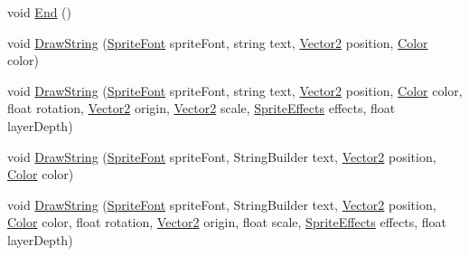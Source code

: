 \begin{DoxyCompactItemize}
\item 
void \hyperlink{class_microsoft_1_1_xna_1_1_framework_1_1_graphics_1_1_sprite_batch_aa31a6d628df3a751c361cfd70c50a5cb}{End} ()
\item 
void \hyperlink{class_microsoft_1_1_xna_1_1_framework_1_1_graphics_1_1_sprite_batch_a7b0afe482509ad47b5eccfb7a8fedb17}{Draw\+String} (\hyperlink{class_microsoft_1_1_xna_1_1_framework_1_1_graphics_1_1_sprite_font}{Sprite\+Font} sprite\+Font, string text, \hyperlink{struct_microsoft_1_1_xna_1_1_framework_1_1_vector2}{Vector2} position, \hyperlink{struct_microsoft_1_1_xna_1_1_framework_1_1_color}{Color} color)
\item 
void \hyperlink{class_microsoft_1_1_xna_1_1_framework_1_1_graphics_1_1_sprite_batch_a995753c36e285ef724f3166eef612b1a}{Draw\+String} (\hyperlink{class_microsoft_1_1_xna_1_1_framework_1_1_graphics_1_1_sprite_font}{Sprite\+Font} sprite\+Font, string text, \hyperlink{struct_microsoft_1_1_xna_1_1_framework_1_1_vector2}{Vector2} position, \hyperlink{struct_microsoft_1_1_xna_1_1_framework_1_1_color}{Color} color, float rotation, \hyperlink{struct_microsoft_1_1_xna_1_1_framework_1_1_vector2}{Vector2} origin, \hyperlink{struct_microsoft_1_1_xna_1_1_framework_1_1_vector2}{Vector2} scale, \hyperlink{namespace_microsoft_1_1_xna_1_1_framework_1_1_graphics_ac5bcbceca6e9af6d220bd386c001d68c}{Sprite\+Effects} effects, float layer\+Depth)
\item 
void \hyperlink{class_microsoft_1_1_xna_1_1_framework_1_1_graphics_1_1_sprite_batch_a665ec3aa07172409b05dc93a980200a3}{Draw\+String} (\hyperlink{class_microsoft_1_1_xna_1_1_framework_1_1_graphics_1_1_sprite_font}{Sprite\+Font} sprite\+Font, String\+Builder text, \hyperlink{struct_microsoft_1_1_xna_1_1_framework_1_1_vector2}{Vector2} position, \hyperlink{struct_microsoft_1_1_xna_1_1_framework_1_1_color}{Color} color)
\item 
void \hyperlink{class_microsoft_1_1_xna_1_1_framework_1_1_graphics_1_1_sprite_batch_aa2f0fcf8eb29f22ae813e4dbf74bdbf7}{Draw\+String} (\hyperlink{class_microsoft_1_1_xna_1_1_framework_1_1_graphics_1_1_sprite_font}{Sprite\+Font} sprite\+Font, String\+Builder text, \hyperlink{struct_microsoft_1_1_xna_1_1_framework_1_1_vector2}{Vector2} position, \hyperlink{struct_microsoft_1_1_xna_1_1_framework_1_1_color}{Color} color, float rotation, \hyperlink{struct_microsoft_1_1_xna_1_1_framework_1_1_vector2}{Vector2} origin, float scale, \hyperlink{namespace_microsoft_1_1_xna_1_1_framework_1_1_graphics_ac5bcbceca6e9af6d220bd386c001d68c}{Sprite\+Effects} effects, float layer\+Depth)

\end{DoxyCompactItemize}
